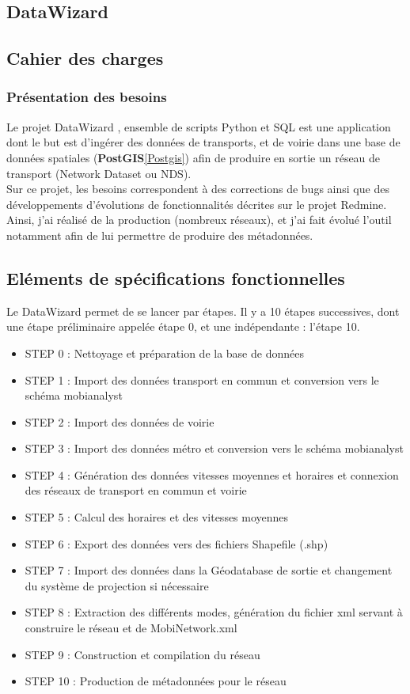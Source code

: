 \begin{itemize}
\pagebreak

\section{DataWizard}\label{DataWizard}

\subsection{Cahier des charges}

\subsubsection{Présentation des besoins}

Le projet \og DataWizard \fg, ensemble de scripts Python et SQL est une application dont le but est d'ingérer des données de transports, et de voirie dans une base de données spatiales (\textbf{PostGIS}\ref{Postgis}) afin de produire en sortie un réseau de transport (Network Dataset ou NDS).\\
Sur ce projet, les besoins correspondent à des corrections de bugs ainsi que des développements d'évolutions de fonctionnalités décrites sur le projet Redmine. Ainsi, j'ai réalisé de la production (nombreux réseaux), et j'ai fait évolué l'outil notamment afin de lui permettre de produire des métadonnées.


\subsection{Eléments de spécifications fonctionnelles}

Le DataWizard permet de se lancer par étapes. Il y a 10 étapes successives, dont une étape préliminaire appelée étape 0, et une indépendante : l'étape 10.
\begin{itemize}
\item STEP 0 : Nettoyage et préparation de la base de données
\item STEP 1 : Import des données transport en commun et conversion vers le schéma mobianalyst
\item STEP 2 : Import des données de voirie
\item STEP 3 : Import des données métro et conversion vers le schéma mobianalyst
\item STEP 4 : Génération des données vitesses moyennes et horaires et connexion des réseaux de transport en commun et voirie
\item STEP 5 : Calcul des horaires et des vitesses moyennes
\item STEP 6 : Export des données vers des fichiers Shapefile (.shp)
\item STEP 7 : Import des données dans la Géodatabase de sortie et changement du système de projection si nécessaire
\item STEP 8 : Extraction des différents modes, génération du fichier xml servant à construire le réseau et de MobiNetwork.xml
\item STEP 9 : Construction et compilation du réseau
\item STEP 10 : Production de métadonnées pour le réseau
\end{itemize}


\end{itemize}
